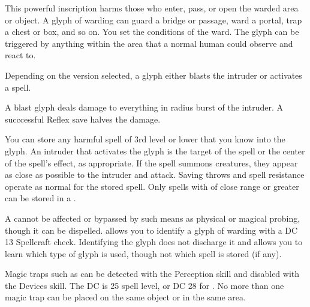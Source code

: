 \spelleffect \par This powerful inscription harms those who enter, pass, or open the warded area or object. A glyph of warding can guard a bridge or passage, ward a portal, trap a chest or box, and so on. You set the conditions of the ward. The glyph can be triggered by anything within the area that a normal human could observe and react to.
\par Depending on the version selected, a glyph either blasts the intruder or activates a spell.
\par {} A blast glyph deals damage to everything in \areasmall radius burst of the intruder. A succcessful Reflex save halves the damage.
\par {} You can store any harmful spell of 3rd level or lower that you know into the glyph. An intruder that activates the glyph is the target of the spell or the center of the spell's effect, as appropriate. If the spell summons creatures, they appear as close as possible to the intruder and attack. Saving throws and spell resistance operate as normal for the stored spell. Only spells with of close range or greater can be stored in a .
\spellnotes \par A  cannot be affected or bypassed by such means as physical or magical probing, though it can be dispelled.  allows you to identify a glyph of warding with a DC 13 Spellcraft check. Identifying the glyph does not discharge it and allows you to learn which type of glyph is used, though not which spell is stored (if any).
\par Magic traps such as  can be detected with the Perception skill and disabled with the Devices skill. The DC is 25 \add spell level, or DC 28 for . No more than one magic trap can be placed on the same object or in the same area.

